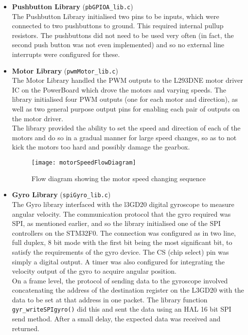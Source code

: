 \begin{itemize}
    \item \textbf{Pushbutton Library} (\texttt{pbGPIOA\_lib.c})\\
    The Pushbutton Library initialised two pins to be inputs, which were connected to two pushbuttons to ground. This required internal pullup resistors. The pushbuttons did not need to be used very often (in fact, the second push button was not even implemented) and so no external line interrupts were configured for these.

    \item \textbf{Motor Library} (\texttt{pwmMotor\_lib.c})\\
    The Motor Library handled the PWM outputs to the L293DNE motor driver IC on the PowerBoard which drove the motors and varying speeds. The library initialised four PWM outputs (one for each motor and direction), as well as two general purpose output pins for enabling each pair of outputs on the motor driver.\\

    The library provided the ability to set the speed and direction of each of the motors and do so in a gradual manner for large speed changes, so as to not kick the motors too hard and possibly damage the gearbox.

    \begin{figure}[H]
      \begin{center}
        \texttt{[image: motorSpeedFlowDiagram]}
        \caption{Flow diagram showing the motor speed changing sequence}
        \label{fig:motorSpeedFlowDiagram}
      \end{center}
    \end{figure}

    \item \textbf{Gyro Library} (\texttt{spiGyro\_lib.c})\\
    The Gyro library interfaced with the l3GD20 digital gyroscope to measure angular velocity. The communication protocol that the gyro required was SPI, as mentioned earlier, and so the library initialised one of the SPI controllers on the STM32F0. The connection was configured as in two line, full duplex, 8 bit mode with the first bit being the most significant bit, to satisfy the requirements of the gyro device. The CS (chip select) pin was simply a digital output. A timer was also configured for integrating the velocity output of the gyro to acquire angular position.\\

    On a frame level, the protocol of sending data to the gyroscope involved concatenating the address of the destination register on the L3GD20 with the data to be set at that address in one packet. The library function \texttt{gyr\_writeSPIgyro()} did this and sent the data using an HAL 16 bit SPI send method. After a small delay, the expected data was received and returned.\\


\end{itemize}
